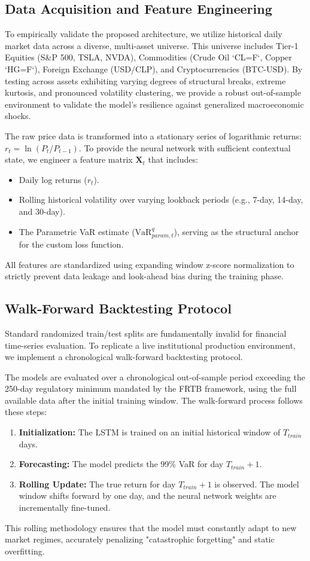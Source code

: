 
\subsection{Data Acquisition and Feature Engineering}
To empirically validate the proposed architecture, we utilize historical daily market data across a diverse, multi-asset universe. This universe includes Tier-1 Equities (S\&P 500, TSLA, NVDA), Commodities (Crude Oil `CL=F`, Copper `HG=F`), Foreign Exchange (USD/CLP), and Cryptocurrencies (BTC-USD). By testing across assets exhibiting varying degrees of structural breaks, extreme kurtosis, and pronounced volatility clustering, we provide a robust out-of-sample environment to validate the model's resilience against generalized macroeconomic shocks.

The raw price data is transformed into a stationary series of logarithmic returns: $r_t = \ln(P_t / P_{t-1})$. To provide the neural network with sufficient contextual state, we engineer a feature matrix $\bm{X}_t$ that includes:
\begin{itemize}
    \item Daily log returns ($r_t$).
    \item Rolling historical volatility over varying lookback periods (e.g., 7-day, 14-day, and 30-day).
    \item The Parametric VaR estimate ($\text{VaR}_{param, t}^q$), serving as the structural anchor for the custom loss function.
\end{itemize}
All features are standardized using expanding window z-score normalization to strictly prevent data leakage and look-ahead bias during the training phase.

\subsection{Walk-Forward Backtesting Protocol}
Standard randomized train/test splits are fundamentally invalid for financial time-series evaluation. To replicate a live institutional production environment, we implement a chronological walk-forward backtesting protocol. 

The models are evaluated over a chronological out-of-sample period exceeding the 250-day regulatory minimum mandated by the FRTB framework, using the full available data after the initial training window. The walk-forward process follows these steps:
\begin{enumerate}
    \item \textbf{Initialization:} The LSTM is trained on an initial historical window of $T_{train}$ days.
    \item \textbf{Forecasting:} The model predicts the 99\% VaR for day $T_{train} + 1$.
    \item \textbf{Rolling Update:} The true return for day $T_{train} + 1$ is observed. The model window shifts forward by one day, and the neural network weights are incrementally fine-tuned.
\end{enumerate}
This rolling methodology ensures that the model must constantly adapt to new market regimes, accurately penalizing "catastrophic forgetting" and static overfitting.


